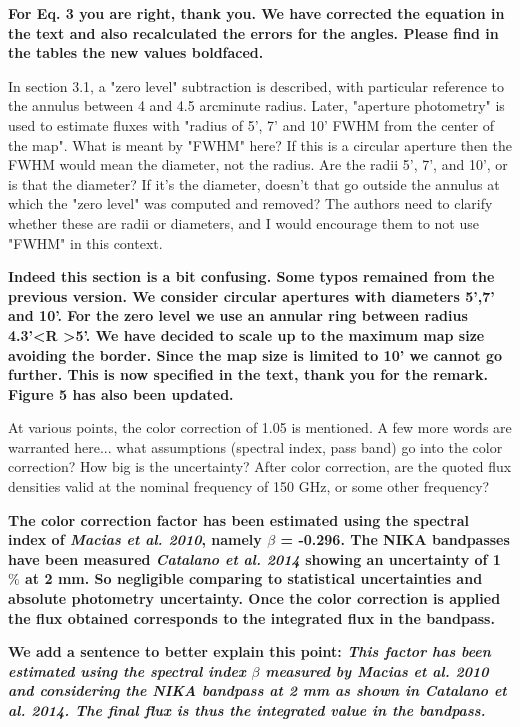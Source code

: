 \documentclass[12pt]{article}
\begin{document}
\begin{enumerate}
{\bf For Eq. 3 you are right, thank you. We have corrected the equation in the text and also recalculated the errors for the angles. Please find in the tables the new values boldfaced.}

In section 3.1, a "zero level" subtraction is described, with 
particular reference to the annulus between 4 and 4.5 arcminute 
radius. Later, "aperture photometry" is used to estimate fluxes with 
"radius of 5', 7' and 10' FWHM from the center of the map". What is 
meant by "FWHM" here? If this is a circular aperture then the FWHM 
would mean the diameter, not the radius. Are the radii 5', 7', and 
10', or is that the diameter? If it's the diameter, doesn't that go 
outside the annulus at which the "zero level" was computed and 
removed? The authors need to clarify whether these are radii or 
diameters, and I would encourage them to not use "FWHM" in this 
context. 

\textbf{Indeed this section is a bit confusing. Some typos remained from the previous version.
  We consider circular apertures with diameters 5',7' and 10'.
  For the zero level we use an annular ring between radius 4.3'\textless R \textgreater 5'. We have decided to scale up to the maximum map size avoiding the border. Since the map size is limited to 10' we cannot go further. This is now specified in the text, thank you for the remark. Figure 5 has also been updated.}

At various points, the color correction of 1.05 is mentioned. A few 
more words are warranted here... what assumptions (spectral index, 
pass band) go into the color correction? How big is the uncertainty? 
After color correction, are the quoted flux densities valid at the 
nominal frequency of 150 GHz, or some other frequency? 

\textbf{The color correction factor has been estimated using the spectral index of {\it Macias et al. 2010}, namely $\beta$ = -0.296. The NIKA bandpasses have been measured {\it Catalano et al. 2014} showing an uncertainty of 1$\%$ at 2 mm. So negligible comparing to statistical uncertainties and absolute photometry uncertainty. Once the color correction is applied the flux obtained corresponds to the integrated flux in the bandpass.}

{\bf  We add a sentence to better explain this point:
 {\it This factor has been estimated using the spectral index $\beta$ measured by {\it Macias et al. 2010} and considering the NIKA bandpass at 2 mm as shown in {\it Catalano et al. 2014}. The final flux is thus the integrated value in the bandpass.}}


\end{enumerate}
\end{document}
